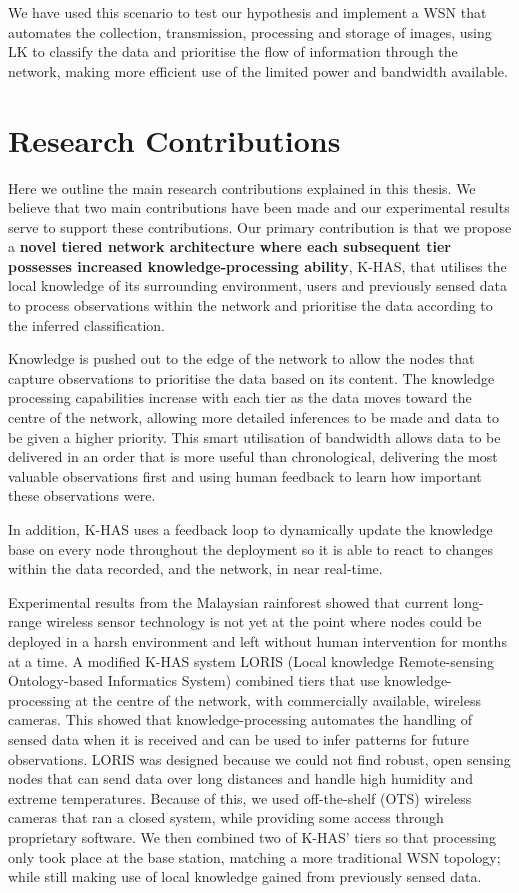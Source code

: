 We have used this scenario to test our hypothesis and implement a WSN that automates the collection, transmission, processing and storage of images, using LK to classify the data and prioritise the flow of information through the network, making more efficient use of the limited power and bandwidth available. 

\section{Research Contributions}

Here we outline the main research contributions explained in this thesis. We believe that two main contributions have been made and our experimental results serve to support these contributions.
Our primary contribution is that we propose a \textbf{novel tiered network architecture where each subsequent tier possesses increased knowledge-processing ability}, K-HAS, that utilises the local knowledge of its surrounding environment, users and previously sensed data to process observations within the network and prioritise the data according to the inferred classification. 

Knowledge is pushed out to the edge of the network to allow the nodes that capture observations to prioritise the data based on its content. The knowledge processing capabilities increase with each tier as the data moves toward the centre of the network, allowing more detailed inferences to be made and data to be given a higher priority. This smart utilisation of bandwidth allows data to be delivered in an order that is more useful than chronological, delivering the most valuable observations first and using human feedback to learn how important these observations were. 

In addition, K-HAS uses a feedback loop to dynamically update the knowledge base on every node throughout the deployment so it is able to react to changes within the data recorded, and the network, in near real-time.

Experimental results from the Malaysian rainforest showed that current long-range wireless sensor technology is not yet at the point where nodes could be deployed in a harsh environment and left without human intervention for months at a time. A modified K-HAS system LORIS (Local knowledge Remote-sensing Ontology-based Informatics System) combined tiers that use knowledge-processing at the centre of the network, with commercially available, wireless cameras. This showed that knowledge-processing automates the handling of sensed data when it is received and can be used to infer patterns for future observations. LORIS was designed because we could not find robust, open sensing nodes that can send data over long distances and handle high humidity and extreme temperatures. Because of this, we used off-the-shelf (OTS) wireless cameras that ran a closed system, while providing some access through proprietary software. We then combined two of K-HAS' tiers so that processing only took place at the base station, matching a more traditional WSN topology; while still making use of local knowledge gained from previously sensed data.

